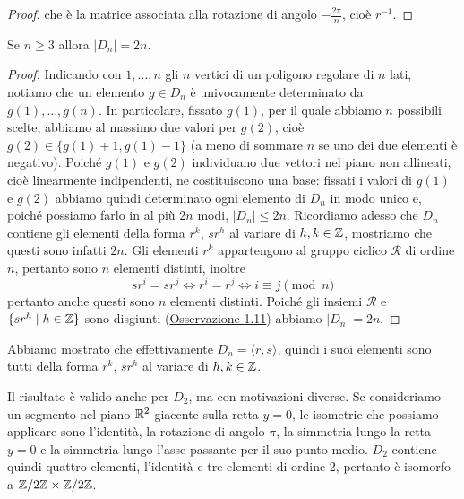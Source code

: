 \documentclass[11pt]{scrartcl}
\begin{document}
\begin{proof}
    che è la matrice associata alla rotazione di angolo $-\displaystyle
    \frac{2\pi}{n}$, cioè $r^{-1}$.
\end{proof}

\begin{proposition}
    Se $n \geqslant 3$ allora $|D_n| = 2n$.
\end{proposition}

\begin{proof}
    Indicando con $1, \ldots, n$ gli $n$ vertici di un poligono regolare di $n$ lati, notiamo
    che un elemento $g \in D_n$ è univocamente determinato da $g(1), \ldots, g(n)$.
    In particolare, fissato $g(1)$, per il quale abbiamo $n$ possibili scelte,
    abbiamo al massimo due valori per $g(2)$, cioè $g(2) \in \{g(1) + 1, g(1) - 1\}$
    (a meno di sommare $n$ se uno dei due elementi è negativo). Poiché $g(1)$
    e $g(2)$ individuano due vettori nel piano non allineati, cioè
    linearmente indipendenti, ne costituiscono una base: fissati i valori di 
    $g(1)$ e $g(2)$ abbiamo quindi determinato ogni
    elemento di $D_n$ in modo unico e, poiché possiamo farlo in al più $2n$ modi, 
    $|D_n| \leq 2n$. Ricordiamo adesso che $D_n$ contiene gli elementi
    della forma $r^k$, $sr^h$ al variare di $h, k \in \mathbb Z$, mostriamo che questi sono 
    infatti $2n$. Gli elementi $r^k$ appartengono al gruppo ciclico $\mathcal{R}$
    di ordine $n$, pertanto sono $n$ elementi distinti, inoltre 
    \[
        sr^i = sr^j \iff r^i = r^j\iff i \equiv j \pmod n
    \] pertanto anche questi sono $n$
    elementi distinti. Poiché gli insiemi $\mathcal{R}$ e 
    $\{sr^h\mid h \in \mathbb Z\}$ sono disgiunti (\hyperref[obs1.0]{Osservazione 1.11}) 
    abbiamo $|D_n| = 2n$.
\end{proof}

\begin{remark}
    Abbiamo mostrato che effettivamente $D_n = \langle r, s\rangle$, quindi i
    suoi elementi sono tutti della forma $r^k$, $sr^h$ al variare di $h, k \in \mathbb Z$. 
\end{remark}

\begin{remark}
    Il risultato è valido anche per $D_2$, ma con motivazioni diverse. 
    Se consideriamo un segmento nel piano $\mathbb R^2$ giacente sulla retta $y = 0$, 
    le isometrie che possiamo applicare sono l'identità, la rotazione di 
    angolo $\pi$, la simmetria lungo la retta $y = 0$ e la simmetria lungo l'asse
    passante per il suo punto medio. $D_2$ contiene quindi quattro elementi,
    l'identità e tre elementi di ordine 2, pertanto è isomorfo a $\mathbb{Z}/{2}\mathbb{Z}\times\mathbb{Z}/{2}\mathbb{Z}$.
\end{remark}
\end{document}
